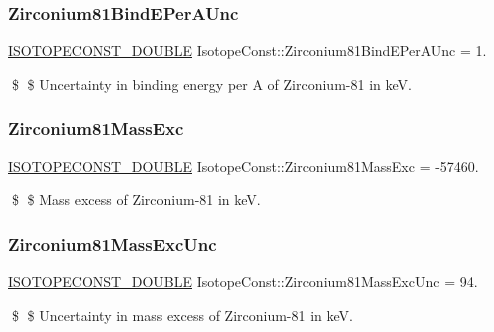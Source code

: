 \subsubsection{\texorpdfstring{Zirconium81\+Bind\+E\+Per\+A\+Unc}{Zirconium81BindEPerAUnc}}
{\footnotesize\ttfamily \mbox{\hyperlink{group___isotope_const-_macros_ga8f45a7272ce02c0b4c65c44636ed719a}{I\+S\+O\+T\+O\+P\+E\+C\+O\+N\+S\+T\+\_\+\+D\+O\+U\+B\+LE}} Isotope\+Const\+::\+Zirconium81\+Bind\+E\+Per\+A\+Unc = 1.}

\$ \$ Uncertainty in binding energy per A of Zirconium-\/81 in keV. \mbox{\label{group___isotope_const-_zirconium-_zr81_ga99e5ec06df90ff0ded5b7ec8d5d2eb22}} 
\subsubsection{\texorpdfstring{Zirconium81\+Mass\+Exc}{Zirconium81MassExc}}
{\footnotesize\ttfamily \mbox{\hyperlink{group___isotope_const-_macros_ga8f45a7272ce02c0b4c65c44636ed719a}{I\+S\+O\+T\+O\+P\+E\+C\+O\+N\+S\+T\+\_\+\+D\+O\+U\+B\+LE}} Isotope\+Const\+::\+Zirconium81\+Mass\+Exc = -\/57460.}

\$ \$ Mass excess of Zirconium-\/81 in keV. \mbox{\label{group___isotope_const-_zirconium-_zr81_gae85a3190ffc116c2e2f75152c305fd6a}} 
\subsubsection{\texorpdfstring{Zirconium81\+Mass\+Exc\+Unc}{Zirconium81MassExcUnc}}
{\footnotesize\ttfamily \mbox{\hyperlink{group___isotope_const-_macros_ga8f45a7272ce02c0b4c65c44636ed719a}{I\+S\+O\+T\+O\+P\+E\+C\+O\+N\+S\+T\+\_\+\+D\+O\+U\+B\+LE}} Isotope\+Const\+::\+Zirconium81\+Mass\+Exc\+Unc = 94.}

\$ \$ Uncertainty in mass excess of Zirconium-\/81 in keV. \mbox{\label{group___isotope_const-_zirconium-_zr81_ga2a5a63eb3844c9deb9c81908173655fb}} 
